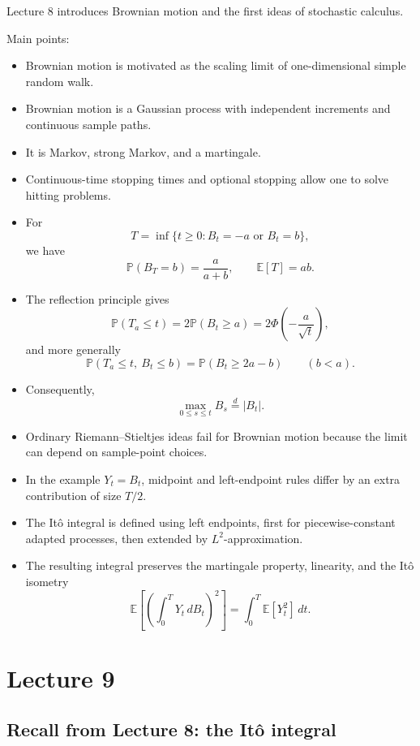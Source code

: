 \documentclass[11pt]{article}
\theoremstyle{definition}
\begin{document}
\begin{summarybox}
Lecture 8 introduces Brownian motion and the first ideas of stochastic calculus.

Main points:
\begin{itemize}[leftmargin=2em]
    \item Brownian motion is motivated as the scaling limit of one-dimensional simple random walk.
    \item Brownian motion is a Gaussian process with independent increments and continuous sample paths.
    \item It is Markov, strong Markov, and a martingale.
    \item Continuous-time stopping times and optional stopping allow one to solve hitting problems.
    \item For
    \[
    T=\inf\{t\ge 0:B_t=-a\text{ or }B_t=b\},
    \]
    we have
    \[
    \mathbb P(B_T=b)=\frac{a}{a+b},
    \qquad
    \mathbb E[T]=ab.
    \]
    \item The reflection principle gives
    \[
    \mathbb P(T_a\le t)=2\mathbb P(B_t\ge a)=2\Phi\!\left(-\frac{a}{\sqrt t}\right),
    \]
    and more generally
    \[
    \mathbb P(T_a\le t,\ B_t\le b)=\mathbb P(B_t\ge 2a-b)
    \qquad (b<a).
    \]
    \item Consequently,
    \[
    \max_{0\le s\le t} B_s \overset{d}= |B_t|.
    \]
    \item Ordinary Riemann--Stieltjes ideas fail for Brownian motion because the limit can depend on sample-point choices.
    \item In the example \(Y_t=B_t\), midpoint and left-endpoint rules differ by an extra contribution of size \(T/2\).
    \item The It\^o integral is defined using left endpoints, first for piecewise-constant adapted processes, then extended by \(L^2\)-approximation.
    \item The resulting integral preserves the martingale property, linearity, and the It\^o isometry
    \[
    \mathbb E\!\left[\left(\int_0^T Y_t\,dB_t\right)^2\right]
    =
    \int_0^T \mathbb E[Y_t^2]\,dt.
    \]
\end{itemize}
\end{summarybox}

\clearpage
\section{Lecture 9}

\subsection{Recall from Lecture 8: the It\^o integral}
\end{document}

